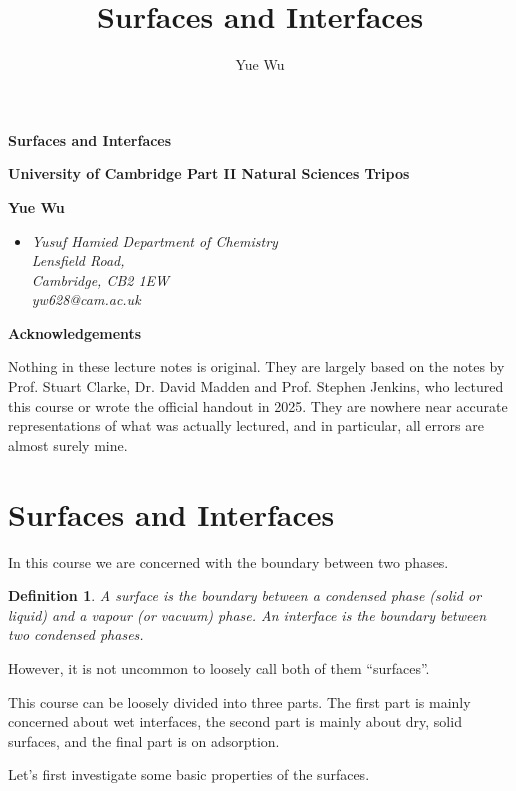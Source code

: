 \documentclass{article}
\title{Surfaces and Interfaces}
\author{Yue Wu}
\theoremstyle{plain}\theoremheaderfont{\normalfont\itshape}\theorembodyfont{\rmfamily}\theoremseparator{.}\newtheorem*{rem}{Remark}\newtheorem*{ex}{Example}\newtheorem*{proof}{Proof}\newtheorem*{altp}{Alternative proof}
\theoremstyle{plain}\theoremheaderfont{\normalfont\bfseries}\theorembodyfont{\rmfamily}\theoremseparator{.}\newtheorem{thm}{Theorem}[section]\newtheorem{lem}[thm]{Lemma}\newtheorem{prop}[thm]{Proposition}\newtheorem*{cor}{Corollary}\newtheorem{defn}[thm]{Definition}\newtheorem{clm}[thm]{Claim}\newtheorem{clminproof}{Claim}\newtheorem*{law}{Law}\newtheorem{pos}[thm]{Postulate}
\theoremstyle{break}\theoremheaderfont{\normalfont\itshape}\theorembodyfont{\rmfamily}\theoremseparator{.\medskip}\newtheorem*{proofskip}{Proof}\newtheorem*{exs}{Examples}\newtheorem*{rems}{Remarks}
\theoremstyle{break}\theoremheaderfont{\normalfont\bfseries}\theorembodyfont{\rmfamily}\theoremseparator{.\medskip}\newtheorem{lemskip}[thm]{Lemma}\newtheorem{defnskip}[thm]{Definition}\newtheorem{propskip}[thm]{Proposition}\newtheorem{thmskip}[thm]{Theorem}
\numberwithin{equation}{section}
\begin{document}
    \setlength{\parindent}{0pt}
	\Huge\textsf{\textbf{Surfaces and Interfaces}}
		
	\Large\textsf{\textbf{University of Cambridge Part II Natural Sciences Tripos}}

	\noindent\makebox[\linewidth]{\rule{\textwidth}{2pt}}

	\large\textsf{\textbf{Yue Wu}}
	\begin{itemize}[topsep=0pt,leftmargin=15pt]
		\item[] \textit{Yusuf Hamied Department of Chemistry\\
		Lensfield Road,\\
		Cambridge, CB2 1EW}\\

		\textit{yw628@cam.ac.uk}
	\end{itemize}
	\thispagestyle{empty}
	\setlength{\parindent}{15pt}

    \newpage
    \begin{center}
		\textbf{\Large{Acknowledgements}}
	\end{center}
	\large
	Nothing in these lecture notes is original. They are largely based on the notes by Prof. Stuart Clarke, Dr. David Madden and Prof. Stephen Jenkins, who lectured this course or wrote the official handout in 2025. They are nowhere near accurate representations of what was actually lectured, and in particular, all errors are almost surely mine.

	\normalsize
    \newpage
	\tableofcontents
	\newpage

    \section{Surfaces and Interfaces}
	In this course we are concerned with the boundary between two phases.
	\begin{defn}
		A \textit{surface} is the boundary between a condensed phase (solid or liquid) and a vapour (or vacuum) phase. An \textit{interface} is the boundary between two condensed phases.
	\end{defn}
	However, it is not uncommon to loosely call both of them ``surfaces''.

	This course can be loosely divided into three parts. The first part is mainly concerned about wet interfaces, the second part is mainly about dry, solid surfaces, and the final part is on adsorption.

	Let's first investigate some basic properties of the surfaces.
\end{document}
